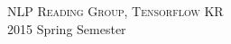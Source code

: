 \documentclass[twoside]{article}
\begin{document}
\begin{titlepage}
\textsc{ NLP Reading Group, Tensorflow KR}\\[1.5cm] %


2015 Spring Semester


 


\end{titlepage}


\tableofcontents
\newpage


\end{document}
